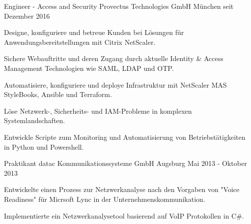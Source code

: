 


\begin{cventries}



\cventry
{Engineer - Access and Security} %
{Provectus Technologies GmbH} %
{München} %
{seit Dezember 2016} %
{ %
\begin{cvitems}
\item {Designe, konfiguriere und betreue Kunden bei Lösungen für Anwendungsbereitstellungen mit Citrix NetScaler.}
\item {Sichere Webauftritte und deren Zugang durch aktuelle Identity \& Access Management Technologien wie SAML, LDAP und OTP.}
\item {Automatisiere, konfiguriere und deploye Infrastruktur mit NetScaler MAS StyleBooks, Ansible und Terraform. }
\item {Löse Netzwerk-, Sicherheits- und IAM-Probleme in komplexen Systemlandschaften.}
\item {Entwickle Scripte zum Monitoring und Automatisierung von Betriebstätigkeiten in Python und Powershell.}
\end{cvitems}
}


\cventry
{Praktikant} %
{datac Kommunikationssysteme GmbH} %
{Augsburg} %
{Mai 2013 - Oktober 2013} %
{ %
\begin{cvitems}
\item {Entwickelte einen Prozess zur Netzwerkanalyse nach den Vorgaben von "Voice Readiness" für Micrsoft Lync in der Unternehmenskommunikation.}
\item {Implementierte ein Netzwerkanalysetool basierend auf VoIP Protokollen in C\#.}
\end{cvitems}
}


\end{cventries}
